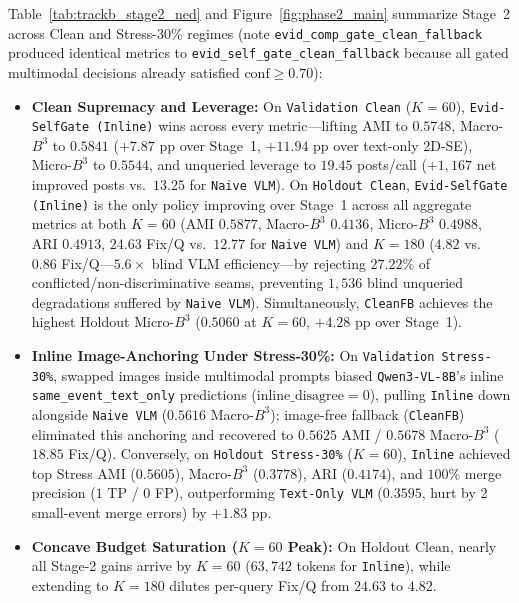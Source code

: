 Table~\ref{tab:trackb_stage2_ned} and Figure~\ref{fig:phase2_main} summarize Stage~2 across Clean and Stress-30\% regimes (note \texttt{evid\_comp\_gate\_clean\_fallback} produced identical metrics to \texttt{evid\_self\_gate\_clean\_fallback} because all gated multimodal decisions already satisfied $\text{conf} \ge 0.70$):

\begin{itemize}
    \item \textbf{Clean Supremacy and Leverage:} On \texttt{Validation Clean} ($K=60$), \texttt{Evid-SelfGate (Inline)} wins across every metric---lifting AMI to $0.5748$, Macro-$B^3$ to $0.5841$ ($+7.87\text{ pp}$ over Stage~1, $+11.94\text{ pp}$ over text-only 2D-SE), Micro-$B^3$ to $0.5544$, and unqueried leverage to $19.45$ posts/call ($+1{,}167$ net improved posts vs.\ $13.25$ for \texttt{Naive VLM}). On \texttt{Holdout Clean}, \texttt{Evid-SelfGate (Inline)} is the only policy improving over Stage~1 across all aggregate metrics at both $K=60$ (AMI $0.5877$, Macro-$B^3$ $0.4136$, Micro-$B^3$ $0.4988$, ARI $0.4913$, $24.63$ Fix/Q vs.\ $12.77$ for \texttt{Naive VLM}) and $K=180$ ($4.82$ vs.\ $0.86$ Fix/Q---$5.6\times$ blind VLM efficiency---by rejecting $27.22\%$ of conflicted/non-discriminative seams, preventing $1{,}536$ blind unqueried degradations suffered by \texttt{Naive VLM}). Simultaneously, \texttt{CleanFB} achieves the highest Holdout Micro-$B^3$ ($0.5060$ at $K=60$, $+4.28\text{ pp}$ over Stage~1).
    \item \textbf{Inline Image-Anchoring Under Stress-30\%:} On \texttt{Validation Stress-30\%}, swapped images inside multimodal prompts biased \texttt{Qwen3-VL-8B}'s inline \texttt{same\_event\_text\_only} predictions ($\text{inline\_disagree} = 0$), pulling \texttt{Inline} down alongside \texttt{Naive VLM} ($0.5616$ Macro-$B^3$); image-free fallback (\texttt{CleanFB}) eliminated this anchoring and recovered to $0.5625$ AMI / $0.5678$ Macro-$B^3$ ($18.85$ Fix/Q). Conversely, on \texttt{Holdout Stress-30\%} ($K=60$), \texttt{Inline} achieved top Stress AMI ($0.5605$), Macro-$B^3$ ($0.3778$), ARI ($0.4174$), and $100\%$ merge precision ($1$ TP / $0$ FP), outperforming \texttt{Text-Only VLM} ($0.3595$, hurt by 2 small-event merge errors) by $+1.83\text{ pp}$.
    \item \textbf{Concave Budget Saturation ($K=60$ Peak):} On Holdout Clean, nearly all Stage-2 gains arrive by $K=60$ ($63{,}742$ tokens for \texttt{Inline}), while extending to $K=180$ dilutes per-query Fix/Q from $24.63$ to $4.82$.
\end{itemize}

